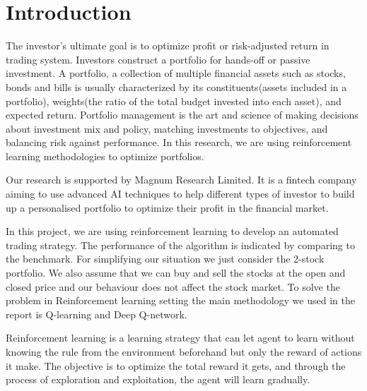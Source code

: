 \chapter{Introduction}\label{Ch:Introduction}

The investor’s ultimate goal is to optimize profit or risk-adjusted return in trading system. Investors construct a portfolio for hands-off or passive investment. A portfolio, a collection of multiple financial assets such as stocks, bonds and bills is usually characterized by its constituents(assets included in a portfolio), weights(the ratio of the total budget invested into each asset), and expected return. Portfolio management is the art and science of making decisions about investment mix and policy, matching investments to objectives, and balancing risk against performance. In this research, we are using reinforcement learning methodologies to optimize portfolios. 

Our research is supported by Magnum Research Limited. It is a fintech company aiming to use advanced AI techniques to help different types of investor to build up a personalised portfolio to optimize their profit in the financial market.

In this project, we are using reinforcement learning to develop an automated trading strategy. The performance of the algorithm is indicated by comparing to the benchmark. For simplifying our situation we just consider the 2-stock portfolio. We also assume that we can buy and sell the stocks at the open and closed price and our behaviour does not affect the stock market. To solve the problem in Reinforcement learning setting the main methodology we used in the report is Q-learning and Deep Q-network. 

Reinforcement learning is a learning strategy that can let agent to learn without knowing the rule from the environment beforehand but only the reward of actions it make. The objective is to optimize the total reward it gets, and through the process of exploration and exploitation, the agent will learn gradually.

